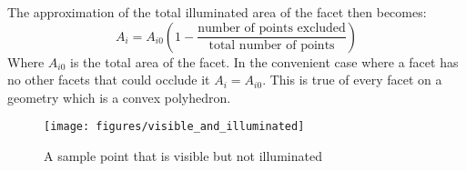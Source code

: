 The approximation of the total illuminated area of the facet then becomes:
\begin{equation}
A_i = A_{i0} \left( 1 - \frac{\text{number of points excluded}}{\text{total number of points}} \right)
\end{equation}
Where $A_{i0}$ is the total area of the facet. In the convenient case where a facet has no other facets that could occlude it $A_i = A_{i0}$. This is true of every facet on a geometry which is a convex polyhedron.
\begin{figure}[h!]
	\centering
	\texttt{[image: figures/visible\_and\_illuminated]}
	\caption{A sample point that is visible but not illuminated}
	\label{sample_pts}
\end{figure}